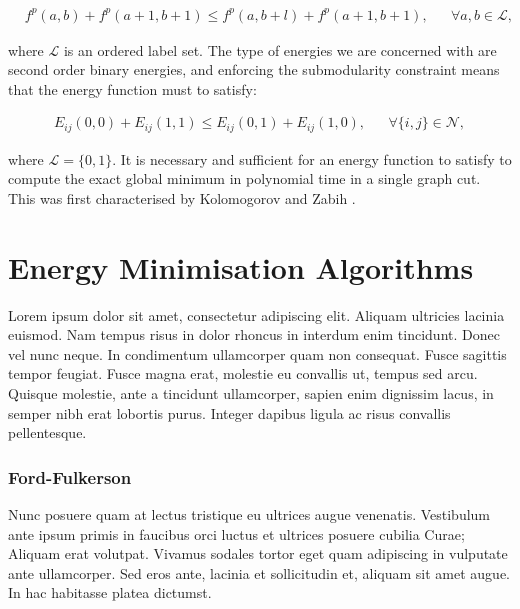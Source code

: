\begin{align}
&f^p(a,b) + f^p(a+1,b+1) \leq f^p(a,b+l) + f^p(a+1,b+1),&  &\forall a,b \in \mathcal{L},&
\end{align}

where $\mathcal{L}$ is an ordered label set. The type of energies we are concerned with are second order binary energies, and enforcing the submodularity constraint means that the energy function must to satisfy:

\begin{align}
&E_{ij}(0,0) + E_{ij}(1,1) \leq E_{ij}(0,1) + E_{ij}(1,0),&  &\forall \{i,j\} \in \mathcal{N},&
\label{eq:submodular_energy}
\end{align}

where $\mathcal{L}=\{0,1\}$. It is necessary and sufficient for an energy function to satisfy  to compute the exact global minimum in polynomial time in a single graph cut. This was first characterised by Kolomogorov and Zabih \citep{Kolmogorov2004}.


\section{Energy Minimisation Algorithms}
\label{sec:MaxFlowMinCutAlgoithms}

Lorem ipsum dolor sit amet, consectetur adipiscing elit. Aliquam ultricies lacinia euismod. Nam tempus risus in dolor rhoncus in interdum enim tincidunt. Donec vel nunc neque. In condimentum ullamcorper quam non consequat. Fusce sagittis tempor feugiat. Fusce magna erat, molestie eu convallis ut, tempus sed arcu. Quisque molestie, ante a tincidunt ullamcorper, sapien enim dignissim lacus, in semper nibh erat lobortis purus. Integer dapibus ligula ac risus convallis pellentesque.

\subsubsection{Ford-Fulkerson}

Nunc posuere quam at lectus tristique eu ultrices augue venenatis. Vestibulum ante ipsum primis in faucibus orci luctus et ultrices posuere cubilia Curae; Aliquam erat volutpat. Vivamus sodales tortor eget quam adipiscing in vulputate ante ullamcorper. Sed eros ante, lacinia et sollicitudin et, aliquam sit amet augue. In hac habitasse platea dictumst.

